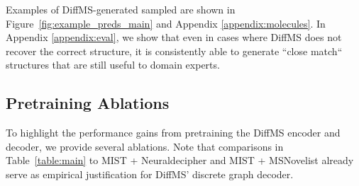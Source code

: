 \documentclass{article}
\theoremstyle{plain}
\theoremstyle{definition}
\theoremstyle{remark}
\newcommand{\ours}{DiffMS\xspace}
\begin{document}
Examples of \ours-generated sampled are shown in Figure~\ref{fig:example_preds_main} and Appendix \ref{appendix:molecules}. In Appendix \ref{appendix:eval}, we show that even in cases where \ours does not recover the correct structure, it is consistently able to generate ``close match`` structures that are still useful to domain experts.


\begin{figure*}[h]
\centering





\vspace{-0.1in}
\caption{Ground truth molecules (left column) and \ours predictions (right columns) on test samples from the MassSpecGym dataset~\citep{bushuiev2024massspecgymbenchmarkdiscoveryidentification}. Tanimoto similarity and MCES metrics listed for each top-$k$ prediction. From top to bottom, the spectra IDs are MassSpecGymID0205184, MassSpecGymID0052933, MassSpecGymID0382596, and MassSpecGymID0152454. The top two rows show cases where \ours successfully reconstructs the true molecule in the top-1 prediction. In the bottom two rows, \ours does not reconstruct the correct molecule. Additional examples can be found in Appendix \ref{appendix:molecules}.}
\label{fig:example_preds_main}
\end{figure*}

\subsection{Pretraining Ablations} \label{sec:ablations}

To highlight the performance gains from pretraining the \ours encoder and decoder, we provide several ablations. Note that comparisons in Table~\ref{table:main} to MIST + Neuraldecipher and MIST + MSNovelist already serve as empirical justification for \ours' discrete graph decoder.
\end{document}
